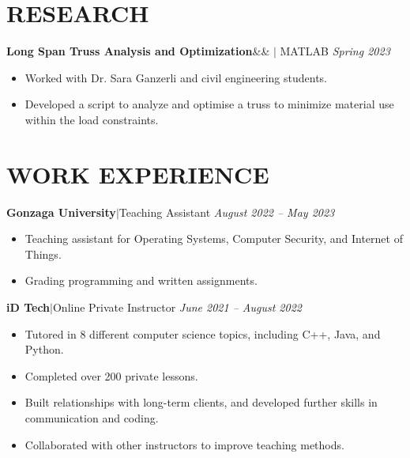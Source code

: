 \documentclass[11pt, a4paper, roman]{moderncv}
\newcommand{\project}[5]{
	\textbf{#1}\ifx&#2&{}
	\else
    		\href{#2}{\:\small\faGithub\:}\fi$|$ #3
	\hfill\textit{#4}
	#5
	\vspace{2mm}
}
\newcommand{\entry}[4]{
	\textbf{#1}\:$|$\:#2 
	\hfill\textit{#3}
	#4
	\vspace{2mm}
}
\begin{document}
\vspace*{-2mm}
\section{RESEARCH}
{\project{Long Span Truss Analysis and Optimization}{}{MATLAB}{Spring 2023}
	{\begin{itemize}
		\item Worked with Dr. Sara Ganzerli and civil engineering students.
		\item Developed a script to analyze and optimise a truss to minimize material use within the load constraints.
	\end{itemize}}
}

\vspace*{-2mm}
\section{WORK EXPERIENCE}

\entry{Gonzaga University}{Teaching Assistant}{August 2022 -- May 2023}
{\begin{itemize}
	\item Teaching assistant for Operating Systems, Computer Security, and Internet of Things.
	\item Grading programming and written assignments.
\end{itemize}
}

\entry{iD Tech}{Online Private Instructor}{June 2021 -- August 2022}
{\begin{itemize}
    \item Tutored in 8 different computer science topics, including C++, Java, and Python.
    \item Completed over 200 private lessons.
    \item Built relationships with long-term clients, and developed further skills in communication and coding.
    \item Collaborated with other instructors to improve teaching methods.
  \end{itemize}
}

\end{document}
